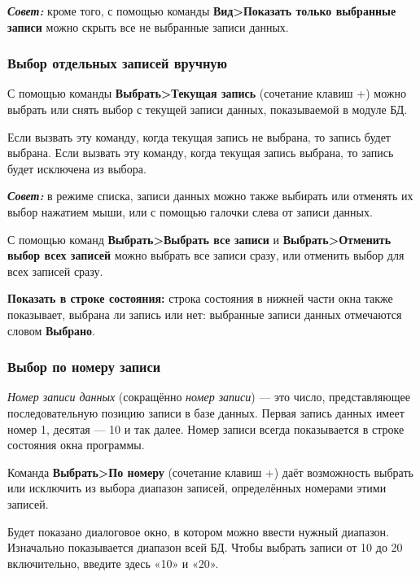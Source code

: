 ﻿\documentclass[a4paper,10pt]{article}
\begin{document}
\begin{mdframed}[backgroundcolor=blue!10]
\textbf{\textit{Совет:}} кроме того, с помощью команды \textbf{Вид>Показать только выбранные записи} можно скрыть все не выбранные записи данных.
\end{mdframed}

\subsubsection{Выбор отдельных записей вручную}
С помощью команды \textbf{Выбрать>Текущая запись} (сочетание клавиш +) можно выбрать или снять выбор с текущей записи данных, показываемой в модуле БД.

Если вызвать эту команду, когда текущая запись не выбрана, то запись будет выбрана. Если вызвать эту команду, когда текущая запись выбрана, то запись будет исключена из выбора.

\begin{mdframed}[backgroundcolor=blue!10]
\textbf{\textit{Совет:}} в режиме списка, записи данных можно также выбирать или отменять их выбор нажатием мыши, или с помощью галочки слева от записи данных.
\end{mdframed}

С помощью команд \textbf{Выбрать>Выбрать все записи} и \textbf{Выбрать>Отменить выбор всех записей} можно выбрать все записи сразу, или отменить выбор для всех записей сразу.

\textbf{Показать в строке состояния:} строка состояния в нижней части окна также показывает, выбрана ли запись или нет: выбранные записи данных отмечаются словом \textbf{Выбрано}.

\subsubsection{Выбор по номеру записи}
\textit{Номер записи данных} (сокращённо \textit{номер записи}) — это число, представляющее последовательную позицию записи в базе данных. Первая запись данных имеет номер 1, десятая — 10 и так далее. Номер записи всегда показывается в строке состояния окна программы.

Команда \textbf{Выбрать>По номеру} (сочетание клавиш +) даёт возможность выбрать или исключить из выбора диапазон записей, определённых номерами этими записей.

Будет показано диалоговое окно, в котором можно ввести нужный диапазон. Изначально показывается диапазон всей БД. Чтобы выбрать записи от 10 до 20 включительно, введите здесь «10» и «20».
\end{document}
